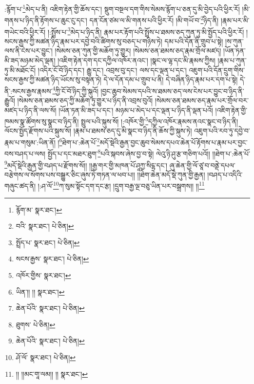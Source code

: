 :རྙོག་པ་\footnote{རྙོག་མ་  སྣར་ཐང་། }མེད་པ་ནི། འཇིག་རྟེན་གྱི་ཆོས་དང་། སྡུག་བསྔལ་དག་གིས་སེམས་རྙོག་པ་ཅན་དུ་མི་བྱེད་པའི་ཕྱིར་རོ། །མི་གནས་པ་ཉིད་ནི་རྟོགས་པ་ཆུང་ངུ་དང་། དན་ངོན་ཙམ་ལ་མི་གནས་པའི་ཕྱིར་རོ། །མི་གཡོ་བ་\footnote{བའི་  སྣར་ཐང་།  པེ་ཅིན། }ཉིད་ནི། །རྣམ་པར་མི་གཡེང་བའི་ཕྱིར་རོ། །:སྤྲོས་པ་\footnote{སྤྲོད་པ་  སྣར་ཐང་།  པེ་ཅིན། }མེད་པ་ཉིད་ནི། རྣམ་པར་རྟོག་པའི་སྤྲོས་པ་ཐམས་ཅད་ཀུན་ཏུ་མི་སྤྱོད་པའི་ཕྱིར་རོ། །སངས་རྒྱས་ཀྱི་མཚན་ཉིད་རྣམ་པར་དབྱེ་བའི་ཚིགས་སུ་བཅད་པ་གཉིས་ཏེ། དམ་པའི་དོན་ནི་གྲུབ་པ་སྟེ། །ས་ཀུན་ལས་ནི་ངེས་པར་བྱུང་། །སེམས་ཅན་ཀུན་གྱི་མཆོག་ཏུ་གྱུར། །སེམས་ཅན་ཐམས་ཅད་རྣམ་གྲོལ་མཛད། །ཡོན་ཏན་མི་ཟད་མཉམ་མེད་ལྡན། །འཇིག་རྟེན་དག་དང་དཀྱིལ་འཁོར་ནའང་། །སྣང་ལ་ལྷ་དང་མི་རྣམས་ཀྱིས། །རྣམ་པ་ཀུན་ཏུ་མི་མཐོང་ངོ། །འདིར་ངོ་བོ་ཉིད་དང་། རྒྱུ་དང་། འབྲས་བུ་དང་། ལས་དང་ལྡན་པ་དང་། འཇུག་པའི་དོན་དྲུག་གིས་སངས་རྒྱས་ཀྱི་མཚན་ཉིད་ཡོངས་སུ་བསྟན་ཏེ། དེ་ལ་དོན་དམ་པ་གྲུབ་པ་ནི། དེ་བཞིན་ཉིད་རྣམ་པར་དག་པ་སྟེ། དེ་ནི་:སངས་རྒྱས་རྣམས་\footnote{སངས་རྒྱས་  སྣར་ཐང་།  པེ་ཅིན། }ཀྱི་ངོ་བོ་ཉིད་ཀྱི་སྐུའོ། །བྱང་ཆུབ་སེམས་དཔའི་ས་ཐམས་ཅད་ལས་ངེས་པར་བྱུང་བ་ཉིད་ནི་རྒྱུའོ། །སེམས་ཅན་ཐམས་ཅད་ཀྱི་མཆོག་ཏུ་གྱུར་པ་ཉིད་ནི་འབྲས་བུའོ། །སེམས་ཅན་ཐམས་ཅད་རྣམ་པར་གྲོལ་བར་མཛད་པ་ཉིད་ནི་ལས་སོ། །ཡོན་ཏན་མི་ཟད་པ་དང་། མཉམ་པ་མེད་པ་དང་ལྡན་པ་ཉིད་ནི་ལྡན་པའོ། །འཇིག་རྟེན་གྱི་ཁམས་སྣ་ཚོགས་སུ་སྣང་བ་ཉིད་ནི། སྤྲུལ་པའི་སྐུས་སོ། །:འཁོར་གྱི་\footnote{འཁོར་གྱིས་  སྣར་ཐང་། }དཀྱིལ་འཁོར་རྣམས་ནའང་སྣང་བ་ཉིད་ནི། ལོངས་སྤྱོད་རྫོགས་པའི་སྐུས་སོ། །རྣམ་པ་ཐམས་ཅད་དུ་མི་སྣང་བ་ཉིད་ནི་ཆོས་ཀྱི་སྐུས་ཏེ། འཇུག་པའི་རབ་ཏུ་དབྱེ་བ་རྣམ་པ་གསུམ་:ཡིན་ནོ། །\footnote{ཡིན་།། །།  སྣར་ཐང་། }ཐེག་པ་:ཆེན་པོ་\footnote{ཆེན་པོའི་  སྣར་ཐང་།  པེ་ཅིན། }མདོ་སྡེའི་རྒྱན་བྱང་ཆུབ་སེམས་དཔའ་ཆེན་པོ་རྟོགས་པ་རྣམ་པར་བྱང་བས་བཤད་པ་ལས། སྤྱོད་པ་དང་མཐར་ཐུག་\footnote{ཐུགས་  པེ་ཅིན། }པའི་སྐབས་ཞེས་བྱ་བ་སྟེ། ལེའུ་ཉི་ཤུ་རྩ་གཅིག་པའོ།། །།ཐེག་པ་:ཆེན་པོ་\footnote{ཆེན་པོའི་  སྣར་ཐང་།  པེ་ཅིན། }མདོ་སྡེའི་རྒྱན་གྱི་བཤད་པ་རྫོགས་སོ།། །།རྒྱ་གར་གྱི་མཁན་པོ་ཤཱཀྱ་སིངྷ་དང་། ཞུ་ཆེན་གྱི་ལོ་ཙཱ་བ་བནྡེ་དཔལ་བརྩེགས་ལ་སོགས་པས་བསྒྱུར་ཅིང་ཞུས་ཏེ་གཏན་ལ་ཕབ་པ།། །།ཐེག་ཆེན་མདོ་སྡེ་ཀུན་གྱི་རྒྱན། །བཤད་པ་འདིའི་གཞུང་ཚད་ནི། །:ཤ་ལོ་\footnote{ཤོ་ལོ་  སྣར་ཐང་།  པེ་ཅིན། }ཀ་སུམ་སྟོང་དག་དང་རྩ། །དྲུག་བརྒྱ་ལྔ་བཅུ་ཡིན་པར་བསྒྲགས།། །།\footnote{།། །།མང་གཱ་ལམ།། །།  སྣར་ཐང་། }